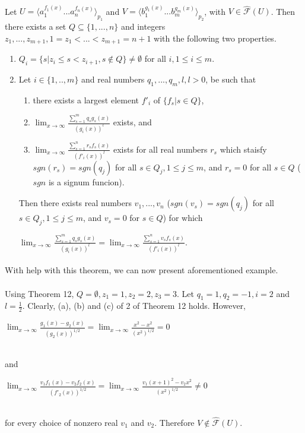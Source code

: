 \paragraph{}
\cveta Let $U = \langle a_{1}^{f_{1}(x)}...a_{n}^{f_{n}(x)} \rangle_{p_{1}} $ and $V = \langle b_{1}^{g_{1}(x)}...b_{m}^{g_{m}(x)} \rangle_{p_{2}} $, with $V \in \hat{\mathcal{F}}(U) $. Then there exists a set $Q \subseteq \{ 1, ..., n \} $ and integers $z_{1}, ..., z_{m+1}, 1=z_{1} < ... < z_{m+1} = n+1 $ with the following two properties.
\begin{enumerate}
\item $Q_{i} = \{ s | z_{i} \leq s < z_{i+1}, s \notin Q \} \neq \emptyset $ for all $i, 1 \leq i \leq m$.
\item Let $i \in \{ 1, .., m\} $ and real numbers $q_{1}, ..., q_{m}, l, l >0$, be such that
\begin{enumerate}
\item there exists a largest element $f'_{i}$ of $\{ f_{s} | s \in Q \} $,
\item $\lim_{x\to \infty }\frac{\sum_{s=1}^{m}q_{s}g_{s}(x)}{(g_{i}(x))^{l}}$ exists, and
\item $\lim_{x\to \infty }\frac{\sum_{s=1}^{n}r_{s}f_{s}(x)}{(f'_{i}(x))^{l}}$ exists for all real numbers $r_{s}$ which staisfy $sgn(r_{s}) = sgn(q_{j})$ for all $s \in Q_{j}, 1 \leq j \leq m$, and $r_{s} = 0$ for all $s \in Q$ ($sgn$ is a signum funcion).
\end{enumerate}
Then there exists real numbers $v_{1},...,v_{n}$ ($sgn(v_{s}) = sgn(q_{j})$ for all $s \in Q_{j}, 1 \leq j \leq m$, and $v_{s} = 0$ for $s\in Q$) for which \\
\centerline{$\lim_{x\to \infty }\frac{\sum_{s=1}^{m}q_{s}g_{s}(x)}{(g_{i}(x))^{l}} = \lim_{x\to \infty }\frac{\sum_{s=1}^{n}v_{s}f_{s}(x)}{(f'_{i}(x))^{l}}$.}
\end{enumerate} 

\paragraph{}
With help with this theorem, we can now present aforementioned example.

\paragraph{}
\priklad Using Theorem 12, $Q = \emptyset, z_{1} = 1, z_{2} = 2, z_{3} = 3$. Let $q_{1} = 1, q_{2} = -1, i = 2$ and $l = \frac{1}{2}$. Clearly, (a), (b) and (c) of 2 of Theorem 12 holds. However, \\
\centerline{$\lim_{x\to \infty }\frac{g_{1}(x)-g_{2}(x)}{(g_{2}(x))^{1/2}} = \lim_{x\to \infty }\frac{x^{2}-x^{2}}{(x^{2})^{1/2}} = 0$} \\
and \\
\centerline{$\lim_{x\to \infty }\frac{v_{1}f_{1}(x)-v_{2}f_{2}(x)}{(f'_{2}(x))^{1/2}} = \lim_{x\to \infty }\frac{v_{1}(x+1)^{2}-v_{2}x^{2}}{(x^{2})^{1/2}} \neq 0$} \\
for every choice of nonzero real $v_{1}$ and $v_{2}$. Therefore $V \notin \hat{\mathcal{F}}(U)$.

\paragraph{}
